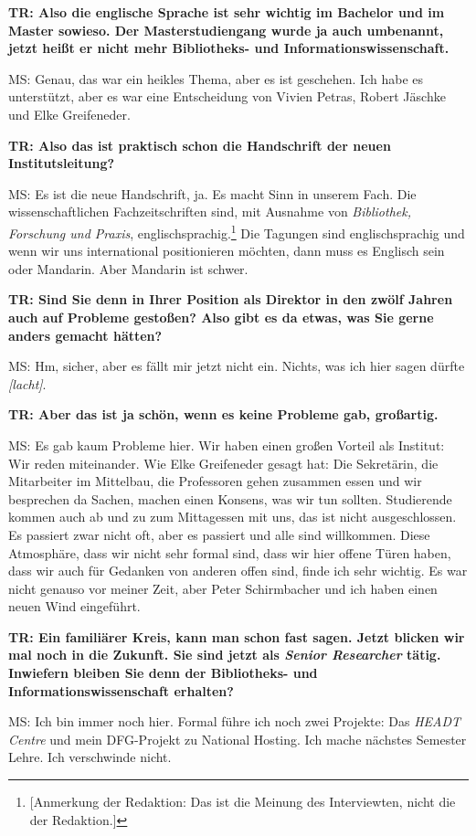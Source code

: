 \documentclass[a4paper,
fontsize=11pt,
oneside,
numbers=noperiodatend,
parskip=half-,
bibliography=totoc,
final
]{scrartcl}
\begin{document}
\textbf{TR: Also die englische Sprache ist sehr wichtig im Bachelor und
im Master sowieso. Der Masterstudiengang wurde ja auch umbenannt, jetzt
heißt er nicht mehr Bibliotheks- und Informationswissenschaft.}

MS: Genau, das war ein heikles Thema, aber es ist geschehen. Ich habe es
unterstützt, aber es war eine Entscheidung von Vivien Petras, Robert
Jäschke und Elke Greifeneder.

\textbf{TR: Also das ist praktisch schon die Handschrift der neuen
Institutsleitung?}

MS: Es ist die neue Handschrift, ja. Es macht Sinn in unserem Fach. Die
wissenschaftlichen Fachzeitschriften sind, mit Ausnahme von
\emph{Bibliothek, Forschung und Praxis}, englischsprachig.\footnote{{[}Anmerkung
  der Redaktion: Das ist die Meinung des Interviewten, nicht die der
  Redaktion.{]}} Die Tagungen sind englischsprachig und wenn wir uns
international positionieren möchten, dann muss es Englisch sein oder
Mandarin. Aber Mandarin ist schwer.

\textbf{TR: Sind Sie denn in Ihrer Position als Direktor in den zwölf
Jahren auch auf Probleme gestoßen? Also gibt es da etwas, was Sie gerne
anders gemacht hätten?}

MS: Hm, sicher, aber es fällt mir jetzt nicht ein. Nichts, was ich hier
sagen dürfte \emph{{[}lacht{]}}.

\textbf{TR: Aber das ist ja schön, wenn es keine Probleme gab,
großartig.}

MS: Es gab kaum Probleme hier. Wir haben einen großen Vorteil als
Institut: Wir reden miteinander. Wie Elke Greifeneder gesagt hat: Die
Sekretärin, die Mitarbeiter im Mittelbau, die Professoren gehen zusammen
essen und wir besprechen da Sachen, machen einen Konsens, was wir tun
sollten. Studierende kommen auch ab und zu zum Mittagessen mit uns, das
ist nicht ausgeschlossen. Es passiert zwar nicht oft, aber es passiert
und alle sind willkommen. Diese Atmosphäre, dass wir nicht sehr formal
sind, dass wir hier offene Türen haben, dass wir auch für Gedanken von
anderen offen sind, finde ich sehr wichtig. Es war nicht genauso vor
meiner Zeit, aber Peter Schirmbacher und ich haben einen neuen Wind
eingeführt.

\textbf{TR: Ein familiärer Kreis, kann man schon fast sagen. Jetzt
blicken wir mal noch in die Zukunft. Sie sind jetzt als \emph{Senior
Researcher} tätig. Inwiefern bleiben Sie denn der Bibliotheks- und
Informationswissenschaft erhalten?}

MS: Ich bin immer noch hier. Formal führe ich noch zwei Projekte: Das
\emph{HEADT Centre} und mein DFG-Projekt zu National Hosting. Ich mache
nächstes Semester Lehre. Ich verschwinde nicht.
\end{document}
